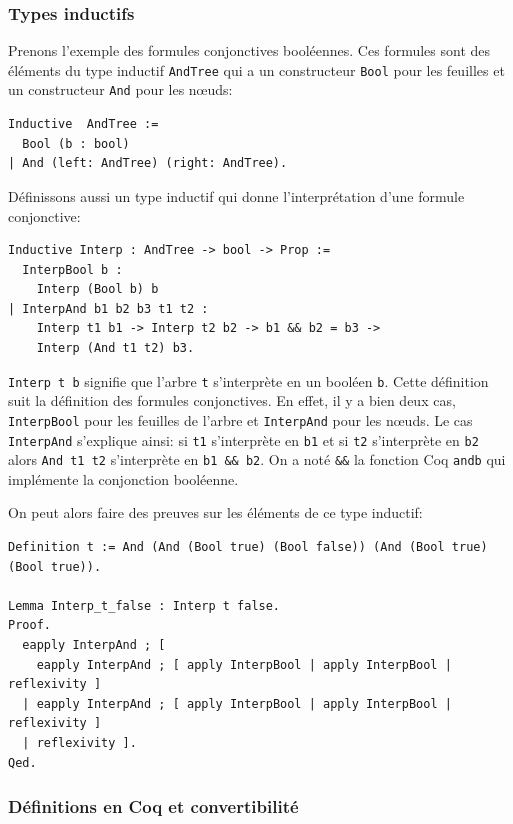 \documentclass[11pt]{article}
\begin{document}
\subsubsection{Types inductifs}

Prenons l'exemple des formules conjonctives booléennes. Ces formules sont des éléments du type inductif \texttt{AndTree} qui a un constructeur \texttt{Bool} pour les feuilles et un constructeur \texttt{And} pour les nœuds: 

\begin{lstlisting}[frame=single]
Inductive  AndTree := 
  Bool (b : bool) 
| And (left: AndTree) (right: AndTree).
\end{lstlisting}

Définissons aussi un type inductif qui donne l'interprétation d'une formule conjonctive: 

\begin{lstlisting}[frame=single]
Inductive Interp : AndTree -> bool -> Prop :=
  InterpBool b :
    Interp (Bool b) b
| InterpAnd b1 b2 b3 t1 t2 :
    Interp t1 b1 -> Interp t2 b2 -> b1 && b2 = b3 ->
    Interp (And t1 t2) b3.
\end{lstlisting}

\texttt{Interp t b} signifie que l'arbre \texttt{t} s'interprète en un booléen \texttt{b}. Cette définition suit la définition des formules conjonctives. En effet, il y a bien deux cas, \texttt{InterpBool} pour les feuilles de l'arbre et \texttt{InterpAnd} pour les nœuds. Le cas \texttt{InterpAnd} s'explique ainsi: si \texttt{t1} s'interprète en \texttt{b1} et si \texttt{t2} s'interprète en \texttt{b2} alors \texttt{And t1 t2} s'interprète en \texttt{b1 \&\& b2}. On a noté \texttt{\&\&} la fonction Coq \texttt{andb} qui implémente la conjonction booléenne.

On peut alors faire des preuves sur les éléments de ce type inductif: 
\begin{lstlisting}[frame=single]
Definition t := And (And (Bool true) (Bool false)) (And (Bool true) (Bool true)).

Lemma Interp_t_false : Interp t false.
Proof.
  eapply InterpAnd ; [
    eapply InterpAnd ; [ apply InterpBool | apply InterpBool | reflexivity ]
  | eapply InterpAnd ; [ apply InterpBool | apply InterpBool | reflexivity ]
  | reflexivity ].
Qed.
\end{lstlisting}

\subsubsection{Définitions en Coq et convertibilité}
\end{document}
